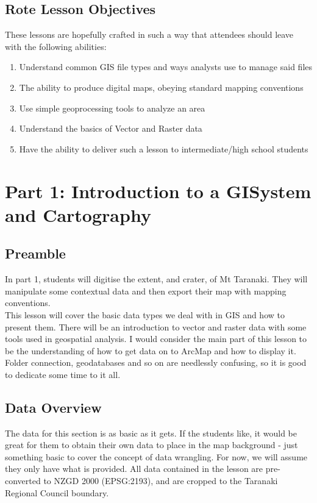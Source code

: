 \documentclass{article}
\begin{document}
\subsection{Rote Lesson Objectives}
These lessons are hopefully crafted in such a way that attendees should leave with the following abilities:
\begin{enumerate}
	\item Understand common GIS file types and ways analysts use to manage said files
	\item The ability to produce digital maps, obeying standard mapping conventions
	\item Use simple geoprocessing tools to analyze an area
	\item Understand the basics of Vector and Raster data
	\item Have the ability to deliver such a lesson to intermediate/high school students
\end{enumerate}
\pagebreak

\section{Part 1: Introduction to a GISystem and Cartography}
\subsection{Preamble}
In part 1, students will digitise the extent, and crater, of Mt Taranaki. They will manipulate some contextual data and then export their map with mapping conventions. \\

This lesson will cover the basic data types we deal with in GIS and how to present them. There will be an introduction to vector and raster data with some tools used in geospatial analysis. I would consider the main part of this lesson to be the understanding of how to get data on to ArcMap and how to display it. Folder connection, geodatabases and so on are needlessly confusing, so it is good to dedicate some time to it all. 

\subsection{Data Overview}
The data for this section is as basic as it gets. If the students like, it would be great for them to obtain their own data to place in the map background - just something basic to cover the concept of data wrangling. For now, we will assume they only have what is provided. All data contained in the lesson are pre-converted to NZGD 2000 (EPSG:2193), and are cropped to the Taranaki Regional Council boundary. 
\end{document}
